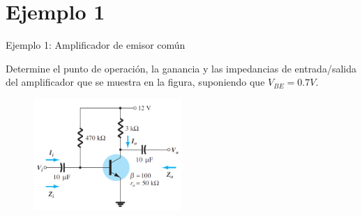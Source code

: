 \documentclass[t,aspectratio=169]{beamer}
\begin{document}
\section{Ejemplo 1}
\begin{frame}{Ejemplo 1: Amplificador de emisor común}

Determine el punto de operación, la ganancia y las impedancias de entrada/salida del amplificador que se muestra en la figura, suponiendo que $V_{BE} = 0.7 V$.

\begin{figure}[H]
    \centering
    \includegraphics[width=0.5\textwidth]{figuras/ejemplo_1_circuito.png}
\end{figure}
    
\end{frame}
\end{document}
